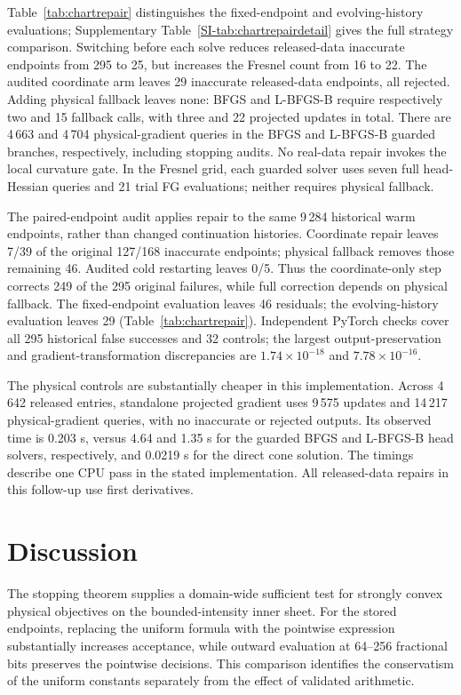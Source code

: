 \documentclass[10pt,a4paper]{article}
\begin{document}
Table~\ref{tab:chartrepair} distinguishes the fixed-endpoint and evolving-history evaluations; Supplementary Table~\ref{SI-tab:chartrepairdetail} gives the full strategy comparison. Switching before each solve reduces released-data inaccurate endpoints from 295 to 25, but increases the Fresnel count from 16 to 22. The audited coordinate arm leaves 29 inaccurate released-data endpoints, all rejected. Adding physical fallback leaves none: BFGS and L-BFGS-B require respectively two and 15 fallback calls, with three and 22 projected updates in total. There are 4\,663 and 4\,704 physical-gradient queries in the BFGS and L-BFGS-B guarded branches, respectively, including stopping audits. No real-data repair invokes the local curvature gate. In the Fresnel grid, each guarded solver uses seven full head-Hessian queries and 21 trial FG evaluations; neither requires physical fallback.

The paired-endpoint audit applies repair to the same 9\,284 historical warm endpoints, rather than changed continuation histories. Coordinate repair leaves 7/39 of the original 127/168 inaccurate endpoints; physical fallback removes those remaining 46. Audited cold restarting leaves 0/5. Thus the coordinate-only step corrects 249 of the 295 original failures, while full correction depends on physical fallback. The fixed-endpoint evaluation leaves 46 residuals; the evolving-history evaluation leaves 29 (Table~\ref{tab:chartrepair}). Independent PyTorch checks cover all 295 historical false successes and 32 controls; the largest output-preservation and gradient-transformation discrepancies are $1.74\times10^{-18}$ and $7.78\times10^{-16}$.

The physical controls are substantially cheaper in this implementation. Across 4\,642 released entries, standalone projected gradient uses 9\,575 updates and 14\,217 physical-gradient queries, with no inaccurate or rejected outputs. Its observed time is 0.203 s, versus 4.64 and 1.35 s for the guarded BFGS and L-BFGS-B head solvers, respectively, and 0.0219 s for the direct cone solution. The timings describe one CPU pass in the stated implementation. All released-data repairs in this follow-up use first derivatives.







\section{Discussion}
The stopping theorem supplies a domain-wide sufficient test for strongly convex physical objectives on the bounded-intensity inner sheet. For the stored endpoints, replacing the uniform formula with the pointwise expression substantially increases acceptance, while outward evaluation at 64--256 fractional bits preserves the pointwise decisions. This comparison identifies the conservatism of the uniform constants separately from the effect of validated arithmetic.
\end{document}
